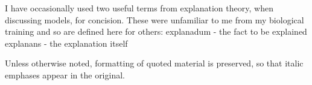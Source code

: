 I have occasionally used two useful terms from explanation theory, when discussing models, for concision. These were unfamiliar to me from my biological training and so are defined here for others:
explanadum - the fact to be explained
explanans - the explanation itself 

Unless otherwise noted, formatting of quoted material is preserved, so that italic emphases appear in the original.